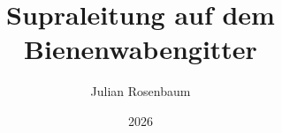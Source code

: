 \documentclass[
  tucolor,       %
  parskip=half,  %
  open=any,      %
  cleardoublepage=plain,  %
  DIV=12
]{tudothesis}
\author{Julian Rosenbaum}
\title{Supraleitung auf dem Bienenwabengitter}
\date{2026}
\begin{document}
\frontmatter
% 
\maketitle

\makecorrectorpage


\tableofcontents

\mainmatter





\appendix



\backmatter
\printbibliography

\cleardoublepage

\end{document}
